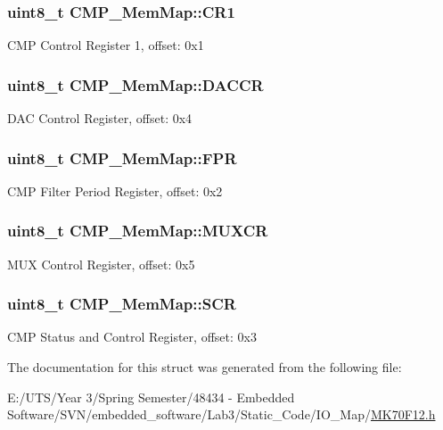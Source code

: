 \subsubsection[{C\+R1}]{\setlength{\rightskip}{0pt plus 5cm}uint8\+\_\+t C\+M\+P\+\_\+\+Mem\+Map\+::\+C\+R1}\label{struct_c_m_p___mem_map_ab790f5d18ef53ba0c9cfc2b5f3ce6668}
C\+M\+P Control Register 1, offset\+: 0x1 \hypertarget{struct_c_m_p___mem_map_a64ad86546fe53058b6fdd5ca1252f7c2}{}
\subsubsection[{D\+A\+C\+C\+R}]{\setlength{\rightskip}{0pt plus 5cm}uint8\+\_\+t C\+M\+P\+\_\+\+Mem\+Map\+::\+D\+A\+C\+C\+R}\label{struct_c_m_p___mem_map_a64ad86546fe53058b6fdd5ca1252f7c2}
D\+A\+C Control Register, offset\+: 0x4 \hypertarget{struct_c_m_p___mem_map_aa793447f43fa77759b6eaf1620bed4bc}{}
\subsubsection[{F\+P\+R}]{\setlength{\rightskip}{0pt plus 5cm}uint8\+\_\+t C\+M\+P\+\_\+\+Mem\+Map\+::\+F\+P\+R}\label{struct_c_m_p___mem_map_aa793447f43fa77759b6eaf1620bed4bc}
C\+M\+P Filter Period Register, offset\+: 0x2 \hypertarget{struct_c_m_p___mem_map_a3b48de300c4b4116ebb942659a2948a2}{}
\subsubsection[{M\+U\+X\+C\+R}]{\setlength{\rightskip}{0pt plus 5cm}uint8\+\_\+t C\+M\+P\+\_\+\+Mem\+Map\+::\+M\+U\+X\+C\+R}\label{struct_c_m_p___mem_map_a3b48de300c4b4116ebb942659a2948a2}
M\+U\+X Control Register, offset\+: 0x5 \hypertarget{struct_c_m_p___mem_map_a3fe55f0243869b50fc54acb9c194d970}{}
\subsubsection[{S\+C\+R}]{\setlength{\rightskip}{0pt plus 5cm}uint8\+\_\+t C\+M\+P\+\_\+\+Mem\+Map\+::\+S\+C\+R}\label{struct_c_m_p___mem_map_a3fe55f0243869b50fc54acb9c194d970}
C\+M\+P Status and Control Register, offset\+: 0x3 

The documentation for this struct was generated from the following file\+:\begin{DoxyCompactItemize}
\item 
E\+:/\+U\+T\+S/\+Year 3/\+Spring Semester/48434 -\/ Embedded Software/\+S\+V\+N/embedded\+\_\+software/\+Lab3/\+Static\+\_\+\+Code/\+I\+O\+\_\+\+Map/\hyperlink{_m_k70_f12_8h}{M\+K70\+F12.\+h}\end{DoxyCompactItemize}
